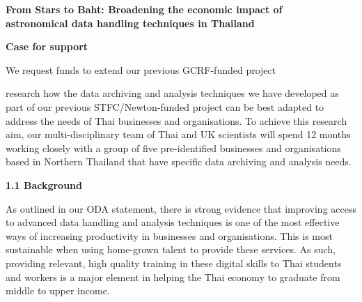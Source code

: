 \documentclass[11pt]{article}
\begin{document}
  \setcounter{figure}{0}
  \noindent
  {\LARGE \bf From Stars to Baht: Broadening the economic impact of \\
  astronomical data handling techniques in Thailand}
  
  \vspace{3mm}
  \noindent
  {\LARGE \bf Case for support}
  \vspace{3mm}
  
  \noindent
  We request funds to extend our previous GCRF-funded project 
  
  research how the data archiving and analysis techniques we have developed as part of our previous STFC/Newton-funded project can be best adapted to address the needs of Thai businesses and organisations. To achieve this research aim, our multi-disciplinary team of Thai and UK scientists will spend 12 months working closely with a group of five pre-identified businesses and organisations based in Northern Thailand that have specific data archiving and analysis needs.
  
  \vspace{3mm}
  \noindent
  {\large \bf 1.1 Background}
  
  \noindent
  As outlined in our ODA statement, there is strong evidence that improving access to advanced data handling and analysis techniques is one of the most effective ways of increasing productivity in businesses and organisations. This is most sustainable when using home-grown talent to provide these services. As such, providing relevant, high quality training in these digital skills to Thai students and workers is a major element in helping the Thai economy to graduate from middle to upper income. 
  
\end{document}
